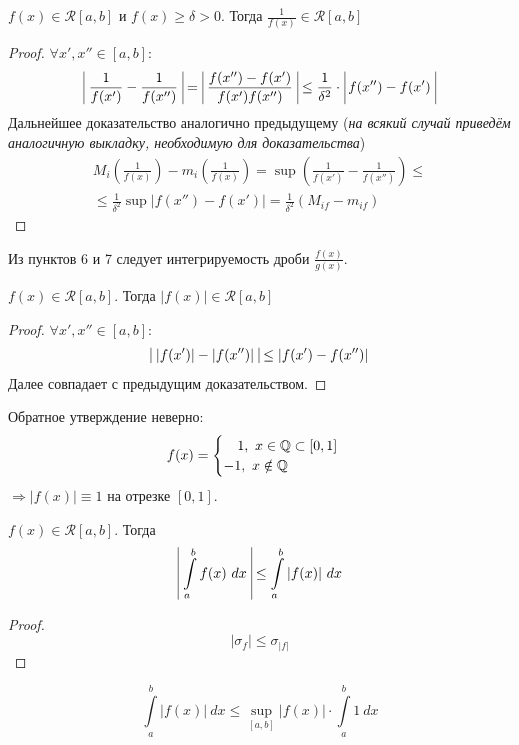 \begin{numtheorem}
    $f(x) \in \mathcal{R}[a, b]$ и $f(x) \geq \delta > 0$. Тогда $\frac{1}{f(x)} \in \mathcal{R}[a, b]$
\end{numtheorem}
\begin{proof}
    $\forall x', x'' \in [a, b]$:
    \begin{align*}
        \vline\ \frac{1}{f(x')} - \frac{1}{f(x'')}\ \vline =\ \vline \frac{f(x'') - f(x')}{f(x')f(x'')}\ \vline \leq \frac{1}{\delta^2}\cdot\ \vline f(x'')-f(x')\ \vline
    \end{align*}
    Дальнейшее доказательство аналогично предыдущему (\textit{на всякий случай приведём аналогичную выкладку, необходимую для доказательства})
    \begin{multline*}
        M_i(\frac{1}{f(x)})-m_i(\frac{1}{f(x)})=\sup(\frac{1}{f(x')}-\frac{1}{f(x'')})\leq\\
        \leq\frac{1}{\delta^2}\sup|f(x'')-f(x')|=\frac{1}{\delta^2}(M_{if}-m_{if})
    \end{multline*}
\end{proof}
\begin{consequense}
    Из пунктов 6 и 7 следует интегрируемость дроби $\frac{f(x)}{g(x)}$.
\end{consequense}
\begin{numtheorem}
    $f(x) \in \mathcal{R}[a, b]$. Тогда $|f(x)| \in \mathcal{R}[a, b]$
\end{numtheorem}
\begin{proof}
    $\forall x', x'' \in [a, b]$:
    \begin{align*}
        \vline\ |f(x')| - |f(x'')|\ \vline \leq |f(x')-f(x'')|
    \end{align*}
    Далее совпадает с предыдущим доказательством.
\end{proof}
\begin{comm}
    Обратное утверждение неверно:
    \[f(x) = \begin{cases}
        \tab[0.35cm] 1, \ x\in\mathbb{Q}\subset [0, 1]\\
        -1,\ x\notin\mathbb{Q}
    \end{cases}\]
    $\Rightarrow |f(x)| \equiv 1$ на отрезке $[0, 1]$.
\end{comm}
\begin{numtheorem}
    $f(x) \in \mathcal{R}[a, b]$. Тогда 
    \[\vline\ \int\limits_{a}^{b}f(x)\ dx\ \vline\leq \int\limits_{a}^{b} |f(x)|\ dx\]
\end{numtheorem}
\begin{proof}
    \[|\sigma_f| \leq \sigma_{|f|}\]
\end{proof}
\begin{comm}
    \[\int\limits_{a}^{b}|f(x)|\ dx \leq \sup \limits_{[a, b]} |f(x)|\cdot\int\limits_{a}^{b}1\ dx\]
\end{comm}
\setcounter{thmcount}{0}
